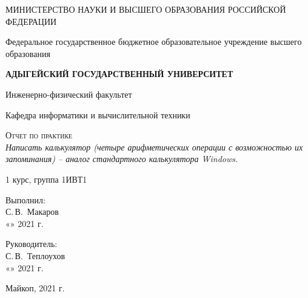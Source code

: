 \documentclass[12pt,a4paper]{scrartcl}
\begin{document}
	\begin{titlepage}
		\begin{center}
			\large
			МИНИСТЕРСТВО НАУКИ И ВЫСШЕГО ОБРАЗОВАНИЯ РОССИЙСКОЙ ФЕДЕРАЦИИ
			
			Федеральное государственное бюджетное образовательное учреждение высшего образования
			
			\textbf{АДЫГЕЙСКИЙ ГОСУДАРСТВЕННЫЙ УНИВЕРСИТЕТ}
			\vspace{0.25cm}
			
			Инженерно-физический факультет
			
			Кафедра информатики и вычислительной техники
			\vfill

			\vfill
			
			\textsc{Отчет по практике}\\[5mm]
			
			{\LARGE \textit{Написать калькулятор (четыре арифметических операции с возможностью их запоминания) – аналог стандартного калькулятора Windows.}}
			\bigskip
			
			1 курс, группа 1ИВТ1
		\end{center}
		\vfill
		
		\newlength{\ML}
		\hfill\begin{minipage}{0.5\textwidth}
			Выполнил:\\
			\underline{\hspace{\ML}} С.\,В.~Макаров\\
			«\underline{\hspace{0.7cm}}» \underline{\hspace{2cm}} 2021 г.
		\end{minipage}%
		\bigskip
		
		\hfill\begin{minipage}{0.5\textwidth}
			Руководитель:\\
			\underline{\hspace{\ML}} С.\,В.~Теплоухов\\
			«\underline{\hspace{0.7cm}}» \underline{\hspace{2cm}} 2021 г.
		\end{minipage}%
		\vfill
		
		\begin{center}
			Майкоп, 2021 г.
		\end{center}
	\end{titlepage}
\end{document}
